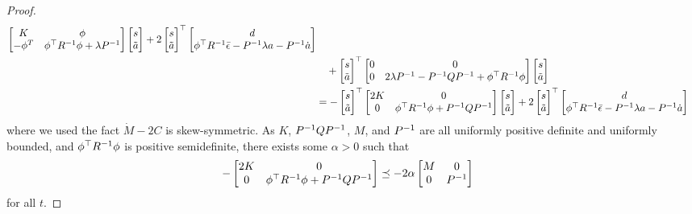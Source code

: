 \begin{proof}
\begin{align}
\begin{bmatrix}
            K & \phi \\
            -\phi^T & \phi^\top R\inv \phi + \lambda P \inv \\ %
        \end{bmatrix}
        \begin{bmatrix}
            \BB s \\ \tilde{\BB a}
        \end{bmatrix}
        + 2 \stackedstate^\top
        \begin{bmatrix}
            \BB d \\
            \phi^\top R\inv \bar{\epsilon} - P\inv \lambda \BB a - P\inv \dot{\BB a}
        \end{bmatrix}
        \\&\quad
        +
        \stackedstate^\top 
        \begin{bmatrix}
            0 & 0 \\
            0 & 2 \lambda P\inv - P\inv Q P\inv + \phi ^\top R^{-1} \phi
        \end{bmatrix}
        \stackedstate
    \\ &=
        - \stackedstate^\top
        \begin{bmatrix}
            2 K & 0 \\
            0 & \phi^\top R\inv \phi + P\inv Q P\inv\\
        \end{bmatrix}
        \begin{bmatrix}
            \BB s \\ \tilde{\BB a}
        \end{bmatrix}
        + 2 \stackedstate^\top
        \begin{bmatrix}
            \BB d \\
            \phi^\top R\inv \bar{\epsilon} - P\inv \lambda \BB a - P\inv \dot{\BB a}
        \end{bmatrix}
\end{align}
where we used the fact $\dot{M}-2C$ is skew-symmetric. As $K$, $ P^{-1} Q P^{-1} $, $M$, and $P^{-1}$ are all uniformly positive definite and uniformly bounded, and $\phi^\top R^{-1} \phi$ is positive semidefinite, there exists some $\alpha > 0$ such that 
\begin{align}
    \label{eq:convergence-rate}
        - \begin{bmatrix}
            2 K & 0 \\
            0 & \phi^\top R^{-1} \phi + P^{-1} Q P^{-1}\\
        \end{bmatrix}
        &\preceq - 2 \alpha
        \begin{bmatrix}
            M & 0 \\
            0 & P^{-1}
        \end{bmatrix}
\end{align}
for all $t$.


\end{proof}
